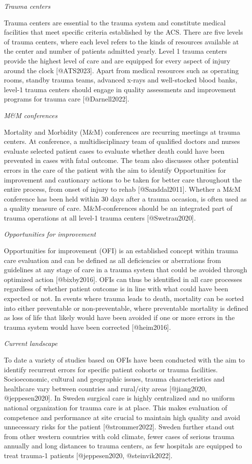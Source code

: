 \documentclass[
]{article}
\begin{document}
\emph{Trauma centers}

Trauma centers are essential to the trauma system and constitute medical
facilities that meet specific criteria established by the ACS. There are
five levels of trauma centers, where each level refers to the kinds of
resources available at the center and number of patients admitted
yearly. Level 1 trauma centers provide the highest level of care and are
equipped for every aspect of injury around the clock {[}@ATS2023{]}.
Apart from medical resources such as operating rooms, standby trauma
teams, advanced x-rays and well-stocked blood banks, level-1 trauma
centers should engage in quality assessments and improvement programs
for trauma care {[}@Darnell2022{]}.

\emph{M\&M conferences}

Mortality and Morbidity (M\&M) conferences are recurring meetings at
trauma centers. At conference, a multidisciplinary team of qualified
doctors and nurses evaluate selected patient cases to evaluate whether
death could have been prevented in cases with fatal outcome. The team
also discusses other potential errors in the care of the patient with
the aim to identify Opportunities for improvement and cautionary actions
to be taken for better care throughout the entire process, from onset of
injury to rehab {[}@Sanddal2011{]}. Whether a M\&M conference has been
held within 30 days after a trauma occasion, is often used as a quality
measure of care. M\&M-conferences should be an integrated part of trauma
operations at all level-1 trauma centers {[}@Swetrau2020{]}.

\emph{Opportunities for improvement}

Opportunities for improvement (OFI) is an established concept within
trauma care evaluation and can be defined as all deficiencies or
aberrations from guidelines at any stage of care in a trauma system that
could be avoided through optimized action {[}@bixby2016{]}. OFIs can
thus be identified in all care processes regardless of whether patient
outcome is in line with what could have been expected or not. In events
where trauma leads to death, mortality can be sorted into either
preventable or non-preventable, where preventable mortality is defined
as loss of life that likely would have been avoided if one or more
errors in the trauma system would have been corrected {[}@heim2016{]}.

\emph{Current landscape}

To date a variety of studies based on OFIs have been conducted with the
aim to identify recurrent errors for specific patient cohorts or trauma
facilities. Socioeconomic, cultural and geographic issues, trauma
characteristics and healthcare vary between countries and rural/city
areas {[}@jiang2020, @jeppesen2020{]}. In Sweden surgical care is highly
centralized and no uniform national organization for trauma care is at
place. This makes evaluation of competence and performance at site
crucial to maintain high quality and avoid unnecessary risks for the
patient {[}@strommer2022{]}. Sweden further stand out from other western
countries with cold climate, fewer cases of serious trauma annually and
long distances to trauma centers, as few hospitals are equipped to treat
trauma-1 patients {[}@jeppesen2020, @steinvik2022{]}.
\end{document}
